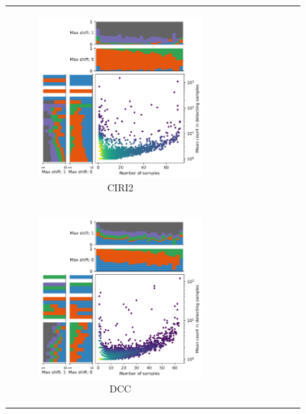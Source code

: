 \begin{figure}[ht]
\begin{tabular}{cc}
\begin{subfigure}{.4\textwidth}
                       \includegraphics[width=\linewidth]{chapters/4_results_and_discussion/figures/detection/density/ciri2.png}
                       \caption{CIRI2} \label{fig:detection_density_ciri2}
                   \end{subfigure}
               \\ \begin{subfigure}{.4\textwidth}
            \centering

            \includegraphics[width=\linewidth]{chapters/4_results_and_discussion/figures/detection/density/dcc.png}
            \caption{DCC} \label{fig:detection_density_dcc} \end{subfigure} &
                  \begin{subfigure}{.4\textwidth} \centering


\end{subfigure}
\end{tabular}
\end{figure}
